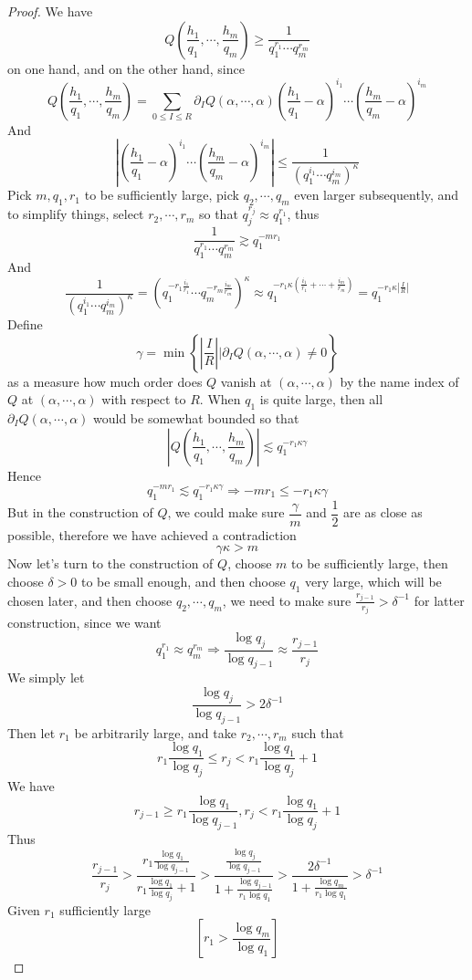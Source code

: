 \begin{proof}
We have
$$ Q\left(\dfrac{h_{1}}{q_{1}},\cdots,\dfrac{h_{m}}{q_{m}}\right) \geq \dfrac{1}{q_{1}^{r_{1}} \cdots q_{m}^{r_{m}}} $$
on one hand, and on the other hand, since
$$ Q\left(\dfrac{h_{1}}{q_{1}},\cdots,\dfrac{h_{m}}{q_{m}}\right) = \sum_{0 \leq I \leq R} \partial_{I}Q(\alpha,\cdots,\alpha)
\left(\dfrac{h_{1}}{q_{1}}-\alpha\right)^{i_{1}} \cdots \left(\dfrac{h_{m}}{q_{m}}-\alpha\right)^{i_{m}} $$
And
$$ \left| \left(\dfrac{h_{1}}{q_{1}}-\alpha\right)^{i_{1}} \cdots \left(\dfrac{h_{m}}{q_{m}}-\alpha\right)^{i_{m}} \right| \leq
\dfrac{1}{(q_{1}^{i_{1}} \cdots q_{m}^{i_{m}})^{\kappa}} $$
Pick $ m, q_{1}, r_{1} $ to be sufficiently large, pick $ q_{2},\cdots,q_{m} $ even larger subsequently, and to simplify things, select $ r_{2},\cdots,r_{m} $ so that $ q_{j}^{r_{j}} \approx q_{1}^{r_{1}} $, thus
$$ \dfrac{1}{q_{1}^{r_{1}} \cdots q_{m}^{r_{m}}} \gtrsim q_{1}^{-mr_{1}} $$
And
$$ \dfrac{1}{(q_{1}^{i_{1}} \cdots q_{m}^{i_{m}})^{\kappa}} = 
\left( q_{1}^{-r_{1}\frac{i_{1}}{r_{1}}} \cdots q_{m}^{-r_{m}\frac{i_{m}}{r_{m}}} \right)^{\kappa} \approx 
q_{1}^{-r_{1}\kappa(\frac{i_{1}}{r_{1}}+\cdots+\frac{i_{m}}{r_{m}})} = q_{1}^{-r_{1}\kappa|\frac{I}{R}|} $$
Define 
$$ \gamma = \min \left\{ \left| \frac{I}{R} \right| \Bigg| \partial_{I}Q(\alpha,\cdots,\alpha) \neq 0 \right\} $$ 
as a measure how much order does $ Q $ vanish at $ (\alpha,\cdots,\alpha) $ by the name index of $ Q $ at $ (\alpha,\cdots,\alpha) $ with respect to $ R $. When $ q_{1} $ is quite large, then all $ \partial_{I}Q(\alpha,\cdots,\alpha) $ would be somewhat bounded so that 
$$ \left| Q\left(\dfrac{h_{1}}{q_{1}},\cdots,\dfrac{h_{m}}{q_{m}}\right) \right| \lesssim q_{1}^{-r_{1}\kappa\gamma} $$
Hence
$$ q_{1}^{-mr_{1}} \lesssim q_{1}^{-r_{1}\kappa\gamma} \Rightarrow -mr_{1} \leq -r_{1}\kappa\gamma $$
But in the construction of $ Q $, we could make sure $ \dfrac{\gamma}{m} $ and $ \dfrac{1}{2} $ are as close as possible, therefore we have achieved a contradiction
$$ \gamma\kappa > m $$
Now let's turn to the construction of $ Q $, choose $ m $ to be sufficiently large, then choose $ \delta > 0 $ to be small enough, and then choose $ q_{1} $ very large, which will be chosen later, and then choose $ q_{2}, \cdots, q_{m} $, we need to make sure $ \frac{r_{j-1}}{r_{j}} > \delta^{-1} $ for latter construction, since we want 
$$ q_{1}^{r_{1}} \approx q_{m}^{r_{m}} \Rightarrow \frac{\log q_{j}}{\log q_{j-1}} \approx \frac{r_{j-1}}{r_{j}} $$
We simply let
$$ \frac{\log q_{j}}{\log q_{j-1}} > 2\delta^{-1} $$
Then let $ r_{1} $ be arbitrarily large, and take $ r_{2},\cdots,r_{m} $ such that
$$ r_{1}\frac{\log q_{1}}{\log q_{j}} \leq r_{j} < r_{1}\frac{\log q_{1}}{\log q_{j}} + 1 $$
We have
$$ r_{j-1} \geq r_{1}\frac{\log q_{1}}{\log q_{j-1}}, r_{j} < r_{1}\frac{\log q_{1}}{\log q_{j}} + 1 $$
Thus
$$ \dfrac{r_{j-1}}{r_{j}} 
> \dfrac{r_{1}\frac{\log q_{1}}{\log q_{j-1}}}{r_{1}\frac{\log q_{1}}{\log q_{j}} + 1} 
> \dfrac{\frac{\log q_{j}}{\log q_{j-1}}}{1+\frac{\log q_{j-1}}{r_{1}\log q_{1}}} 
> \dfrac{2\delta^{-1}}{1+\frac{\log q_{m}}{r_{1}\log q_{1}}} 
> \delta^{-1}
$$
Given $ r_{1} $ sufficiently large
$$ \left[ r_{1} > \dfrac{\log q_{m}}{\log q_{1}} \right] $$
\end{proof}

